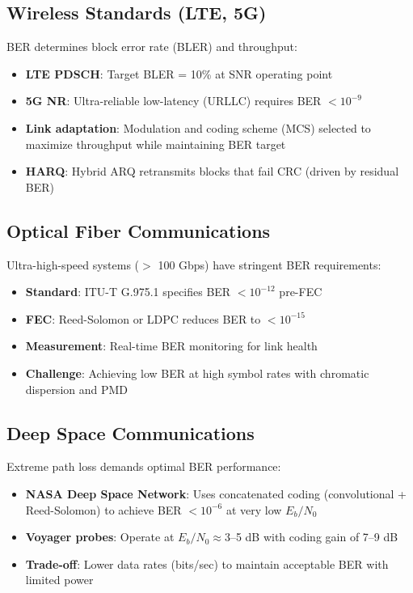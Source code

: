 \subsection{Wireless Standards (LTE, 5G)}

BER determines block error rate (BLER) and throughput:
\begin{itemize}
\item \textbf{LTE PDSCH}: Target BLER = 10\% at SNR operating point
\item \textbf{5G NR}: Ultra-reliable low-latency (URLLC) requires BER $< 10^{-9}$
\item \textbf{Link adaptation}: Modulation and coding scheme (MCS) selected to maximize throughput while maintaining BER target
\item \textbf{HARQ}: Hybrid ARQ retransmits blocks that fail CRC (driven by residual BER)
\end{itemize}

\subsection{Optical Fiber Communications}

Ultra-high-speed systems ($>$ 100 Gbps) have stringent BER requirements:
\begin{itemize}
\item \textbf{Standard}: ITU-T G.975.1 specifies BER $< 10^{-12}$ pre-FEC
\item \textbf{FEC}: Reed-Solomon or LDPC reduces BER to $< 10^{-15}$
\item \textbf{Measurement}: Real-time BER monitoring for link health
\item \textbf{Challenge}: Achieving low BER at high symbol rates with chromatic dispersion and PMD
\end{itemize}

\subsection{Deep Space Communications}

Extreme path loss demands optimal BER performance:
\begin{itemize}
\item \textbf{NASA Deep Space Network}: Uses concatenated coding (convolutional + Reed-Solomon) to achieve BER $< 10^{-6}$ at very low $E_b/N_0$
\item \textbf{Voyager probes}: Operate at $E_b/N_0 \approx 3$--5 dB with coding gain of 7--9 dB
\item \textbf{Trade-off}: Lower data rates (bits/sec) to maintain acceptable BER with limited power
\end{itemize}

